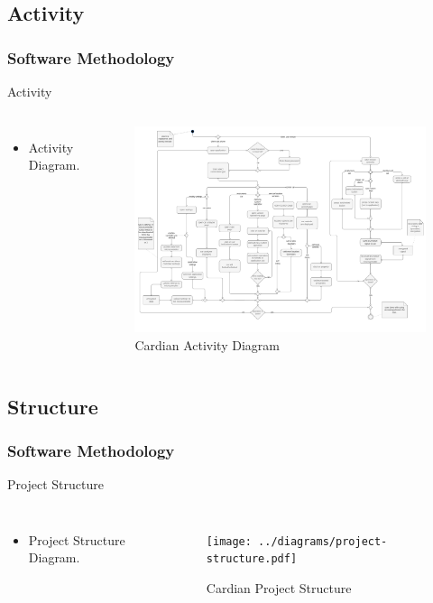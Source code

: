 \documentclass[aspectratio=169,11pt]{beamer}
\begin{document}
	\subsection{Activity}
	\begin{frame}
	\frametitle{Software Methodology}
	\begin{block}{Activity}
		\begin{columns}[c]
			\begin{itemize}
				\item Activity Diagram.
			\end{itemize}
			\begin{figure}[!h]
				\centering
				\includegraphics[width=\textwidth]{../diagrams/activity-diagram.pdf}
				\caption{Cardian Activity Diagram}
			\end{figure}
		\end{columns}
	\end{block}
	\end{frame}

	\subsection{Structure}
	\begin{frame}
	\frametitle{Software Methodology}
	\begin{block}{Project Structure}
		\begin{columns}[c]
			\column{.35\textwidth}
			\begin{itemize}
				\item Project Structure Diagram.
			\end{itemize}
			\column{.55\textwidth}
			\begin{figure}[!h]
				\centering
				\texttt{[image: ../diagrams/project-structure.pdf]}
				\caption{Cardian Project Structure}
			\end{figure}
		\end{columns}
	\end{block}
	\end{frame}
\end{document}
